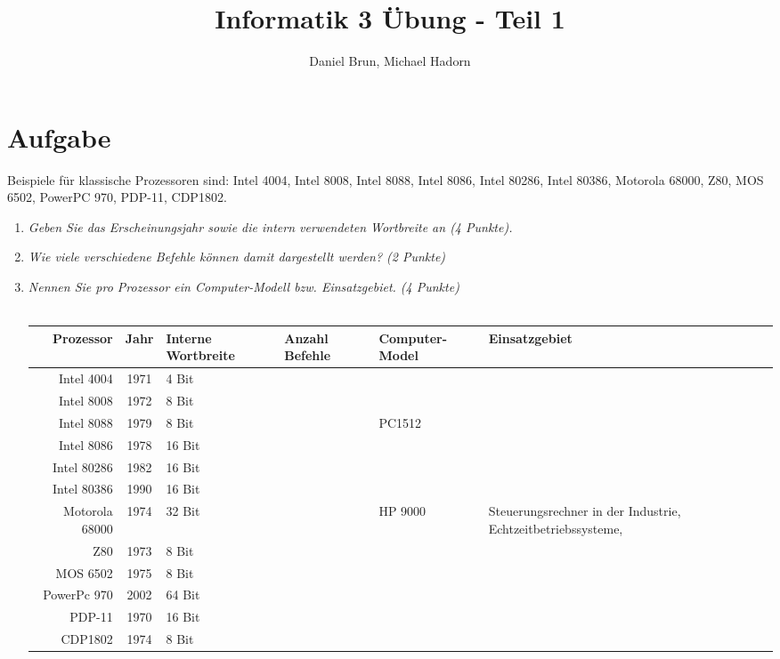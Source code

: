 \documentclass[10pt]{article}
\title{Informatik 3 Übung - Teil 1\vspace{-2ex}}
\author{Daniel Brun, Michael Hadorn\vspace{-2ex}}
\begin{document}
\maketitle

\section{Aufgabe}
Beispiele für klassische Prozessoren sind: Intel 4004, Intel 8008, Intel 8088, Intel 8086, Intel 80286, Intel 80386, Motorola 68000, Z80, MOS 6502, PowerPC 970, PDP-11, CDP1802.

\begin{enumerate}[label=\alph*)]
	\item 
	\textit{Geben Sie das Erscheinungsjahr sowie die intern verwendeten Wortbreite an (4 Punkte).}
	\item
	\textit{Wie viele verschiedene Befehle können damit dargestellt werden? (2 Punkte)}\\
	\item
	\textit{Nennen Sie pro Prozessor ein Computer-Modell bzw. Einsatzgebiet. (4 Punkte)}\\\\
	\begin{tabular}{r | c P{1.8cm} P{1.5cm} p{2cm} p{2cm} }
		Prozessor & Jahr & Interne Wortbreite & Anzahl Befehle & Computer-Model & Einsatzgebiet \\
		\hline
		Intel 4004 & 1971 & 4 Bit & & & \\
		Intel 8008 & 1972 & 8 Bit & & & \\
		Intel 8088 & 1979 & 8 Bit &   & PC1512 & \\
		Intel 8086 & 1978 & 16 Bit & & & \\
		Intel 80286 & 1982 & 16 Bit & & & \\
		Intel 80386 & 1990 & 16 Bit & & & \\
		Motorola 68000 & 1974 & 32 Bit & & HP 9000 & Steuerungsrechner in der Industrie, Echtzeitbetriebssysteme,  \\
		Z80 & 1973 & 8 Bit & & & \\
		MOS 6502 & 1975 & 8 Bit & & & \\
		PowerPc 970 & 2002 & 64 Bit & & & \\
		PDP-11 & 1970 & 16 Bit & & & \\
		CDP1802 & 1974 & 8 Bit & & & \\
	\end{tabular}
	
\end{enumerate}
\end{document}
